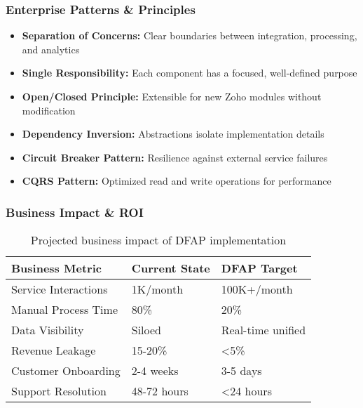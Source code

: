 \subsubsection{Enterprise Patterns \& Principles}
\begin{itemize}
\item \textbf{Separation of Concerns:} Clear boundaries between integration, processing, and analytics
\item \textbf{Single Responsibility:} Each component has a focused, well-defined purpose
\item \textbf{Open/Closed Principle:} Extensible for new Zoho modules without modification
\item \textbf{Dependency Inversion:} Abstractions isolate implementation details
\item \textbf{Circuit Breaker Pattern:} Resilience against external service failures
\item \textbf{CQRS Pattern:} Optimized read and write operations for performance
\end{itemize}

\subsubsection{Business Impact \& ROI}
\begin{table}[h]
\centering
\begin{tabular}{|l|l|l|}
\hline
\textbf{Business Metric} & \textbf{Current State} & \textbf{DFAP Target} \\
\hline
Service Interactions & 1K/month & 100K+/month \\
\hline
Manual Process Time & 80\% & 20\% \\
\hline
Data Visibility & Siloed & Real-time unified \\
\hline
Revenue Leakage & 15-20\% & <5\% \\
\hline
Customer Onboarding & 2-4 weeks & 3-5 days \\
\hline
Support Resolution & 48-72 hours & <24 hours \\
\hline
\end{tabular}
\caption{Projected business impact of DFAP implementation}
\end{table} 